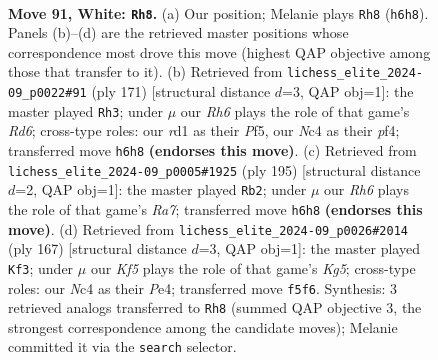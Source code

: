 \documentclass[11pt]{article}
\begin{document}
\clearpage

\begin{figure}[p]\centering
\begin{subfigure}{0.46\textwidth}\centering
\resizebox{\linewidth}{!}{%
\newchessgame
\chessboard[
  setfen={8/1k6/7R/5K2/2N5/8/6P1/3r4 w - - 46 91},
  showmover=false,
  pgfstyle=straightmove, color=movearrow, markmove={h6-h8}
]}
\caption{}
\end{subfigure}\hfill
\begin{subfigure}{0.46\textwidth}\centering
\resizebox{\linewidth}{!}{%
\newchessgame
\chessboard[
  setfen={8/2k5/8/5p2/5P2/3r4/5K2/R7 b - - 41 86},
  showmover=false,
  pgfstyle=straightmove, color=movearrow, markmove={d3-h3}
]}
\caption{}
\end{subfigure}
\\[4pt]
\begin{subfigure}{0.46\textwidth}\centering
\resizebox{\linewidth}{!}{%
\newchessgame
\chessboard[
  setfen={8/5k2/8/8/2n5/7R/r7/4K3 b - - 83 98},
  showmover=false,
  pgfstyle=straightmove, color=movearrow, markmove={a2-b2}
]}
\caption{}
\end{subfigure}\hfill
\begin{subfigure}{0.46\textwidth}\centering
\resizebox{\linewidth}{!}{%
\newchessgame
\chessboard[
  setfen={8/8/8/8/4p1k1/2K5/r7/7R b - - 13 84},
  showmover=false,
  pgfstyle=straightmove, color=movearrow, markmove={g4-f3}
]}
\caption{}
\end{subfigure}
\caption{\textbf{Move 91, White: \texttt{Rh8}.} (a) Our position; Melanie plays \texttt{Rh8} (\texttt{h6h8}). Panels (b)--(d) are the retrieved master positions whose correspondence most drove this move (highest QAP objective among those that transfer to it). (b) Retrieved from \texttt{lichess\_elite\_2024-09\_p0022\#91} (ply 171) [structural distance $d$=3, QAP obj=1]: the master played \texttt{Rh3}; under $\mu$ our \emph{Rh6} plays the role of that game's \emph{Rd6}; cross-type roles: our \emph{r}d1 as their \emph{P}f5, our \emph{N}c4 as their \emph{p}f4; transferred move \texttt{h6h8} \textbf{(endorses this move)}. (c) Retrieved from \texttt{lichess\_elite\_2024-09\_p0005\#1925} (ply 195) [structural distance $d$=2, QAP obj=1]: the master played \texttt{Rb2}; under $\mu$ our \emph{Rh6} plays the role of that game's \emph{Ra7}; transferred move \texttt{h6h8} \textbf{(endorses this move)}. (d) Retrieved from \texttt{lichess\_elite\_2024-09\_p0026\#2014} (ply 167) [structural distance $d$=3, QAP obj=1]: the master played \texttt{Kf3}; under $\mu$ our \emph{Kf5} plays the role of that game's \emph{Kg5}; cross-type roles: our \emph{N}c4 as their \emph{P}e4; transferred move \texttt{f5f6}. Synthesis: 3 retrieved analogs transferred to \texttt{Rh8} (summed QAP objective 3, the strongest correspondence among the candidate moves); Melanie committed it via the \texttt{search} selector.}
\label{fig:thought-m180}
\end{figure}
\end{document}
